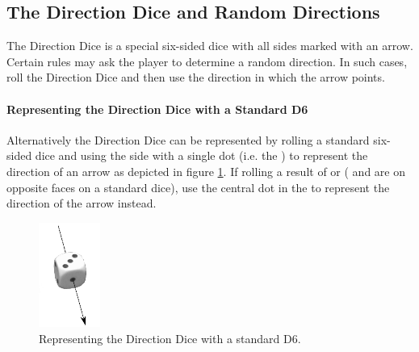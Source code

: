 \subsection{The Direction Dice and Random Directions}
\label{the_direction_dice_and_random_directions}

The Direction Dice is a special six-sided dice with all sides marked with an arrow. Certain rules may ask the player to determine a random direction. In such cases, roll the Direction Dice and then use the direction in which the arrow points.

\paragraph{Representing the Direction Dice with a Standard D6}

Alternatively the Direction Dice can be represented by rolling a standard six-sided dice and using the side with a single dot (i.e. the ) to represent the direction of an arrow as depicted in figure \ref{figure/deviation_dice}. If rolling a result of  or  ( and  are on opposite faces on a standard dice), use the central dot in the  to represent the direction of the arrow instead.

\begin{figure}[!htbp]
\centering
\includegraphics[width=2cm]{pics/deviation_dice.png}
\caption{Representing the Direction Dice with a standard D6.}
\label{figure/deviation_dice}
\end{figure}
